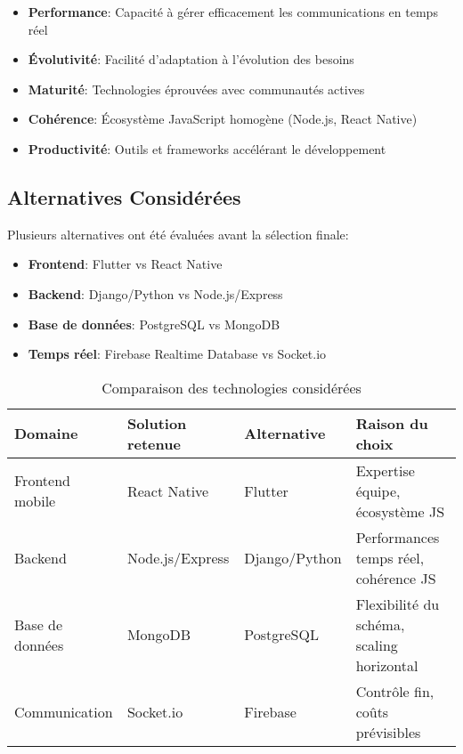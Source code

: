 \begin{itemize}
    \item \textbf{Performance}: Capacité à gérer efficacement les communications en temps réel
    \item \textbf{Évolutivité}: Facilité d'adaptation à l'évolution des besoins
    \item \textbf{Maturité}: Technologies éprouvées avec communautés actives
    \item \textbf{Cohérence}: Écosystème JavaScript homogène (Node.js, React Native)
    \item \textbf{Productivité}: Outils et frameworks accélérant le développement
\end{itemize}

\subsection{Alternatives Considérées}

Plusieurs alternatives ont été évaluées avant la sélection finale:

\begin{itemize}
    \item \textbf{Frontend}: Flutter vs React Native
    \item \textbf{Backend}: Django/Python vs Node.js/Express
    \item \textbf{Base de données}: PostgreSQL vs MongoDB
    \item \textbf{Temps réel}: Firebase Realtime Database vs Socket.io
\end{itemize}

\begin{table}[h]
\centering
\begin{tabular}{|l|l|l|l|}
\hline
\textbf{Domaine} & \textbf{Solution retenue} & \textbf{Alternative} & \textbf{Raison du choix} \\
\hline
Frontend mobile & React Native & Flutter & Expertise équipe, écosystème JS \\
\hline
Backend & Node.js/Express & Django/Python & Performances temps réel, cohérence JS \\
\hline
Base de données & MongoDB & PostgreSQL & Flexibilité du schéma, scaling horizontal \\
\hline
Communication & Socket.io & Firebase & Contrôle fin, coûts prévisibles \\
\hline
\end{tabular}
\caption{Comparaison des technologies considérées}
\label{table:tech-comparison}
\end{table} 